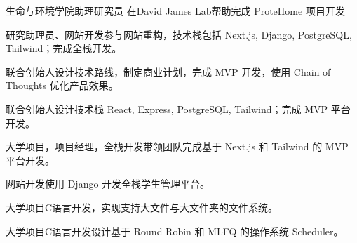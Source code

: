\documentclass[11pt]{article}
\begin{document}
{生命与环境学院助理研究员}
{在David James Lab帮助完成 ProteHome 项目开发}

\vspace{2em} %


{研究助理员、网站开发}{参与网站重构，技术栈包括 Next.js, Django, PostgreSQL, Tailwind；完成全栈开发。}

{联合创始人}{设计技术路线，制定商业计划，完成 MVP 开发，使用 Chain of Thoughts 优化产品效果。}

{联合创始人}{设计技术栈 React, Express, PostgreSQL, Tailwind；完成 MVP 平台开发。}

{大学项目，项目经理，全栈开发}{带领团队完成基于 Next.js 和 Tailwind 的 MVP 平台开发。}

{网站开发}{使用 Django 开发全栈学生管理平台。}

{大学项目}{C语言开发，实现支持大文件与大文件夹的文件系统。}

{大学项目}{C语言开发设计基于 Round Robin 和 MLFQ 的操作系统 Scheduler。}
\end{document}
